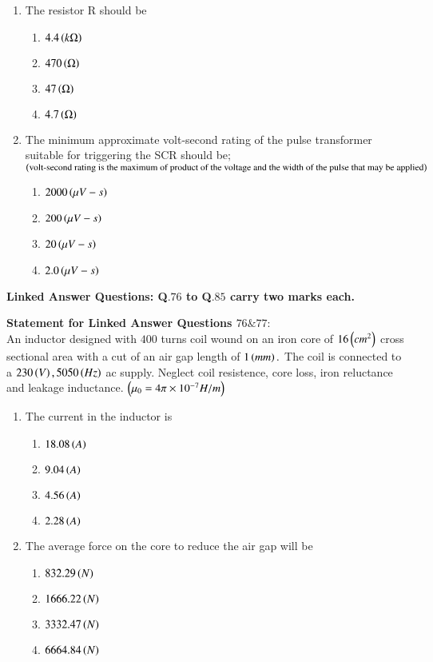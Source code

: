 \documentclass[journal,15pt,onecolumn]{IEEEtran}
\theoremstyle{remark}
\begin{document}
\begin{enumerate}[start=74]
    \item The resistor R should be
    \begin{enumerate}
        \item $4.4\left(k\ohm\right)$
        \item $470\left(\ohm\right)$
        \item $47\left(\ohm\right)$
        \item $4.7\left(\ohm\right)$
    \end{enumerate}
    \item The minimum approximate volt-second rating of the pulse transformer suitable for triggering the SCR should be$;$ $\left(\text{volt-second rating is the maximum of product of the voltage and the width of the pulse that may be applied}\right)$
    \begin{enumerate}
        \item $2000\left(\mu V-s\right)$
        \item $200\left(\mu V-s\right)$
        \item $20\left(\mu V-s\right)$
        \item $2.0\left(\mu V-s\right)$
    \end{enumerate}
\end{enumerate}
\begin{center}
    \textbf{Linked Answer Questions: Q$.76$ to Q$.85$ carry two marks each.}
\end{center}
\textbf{Statement for Linked Answer Questions $76 \& 77:$}\\
An inductor designed with $400$ turns coil wound on an iron core of $16\left(cm^2\right)$ cross sectional area with a cut of an air gap length of $1\left(mm\right).$ The coil is connected to a $230\left(V\right),5050\left(Hz\right)$ ac supply. Neglect coil resistence, core loss, iron reluctance and leakage inductance. $\left(\mu_0=4\pi\times10^{-7}H/m\right)$
\begin{enumerate}[start=76]
    \item The current in the inductor is
    \begin{enumerate}
        \item $18.08\left(A\right)$
        \item $9.04\left(A\right)$
        \item $4.56\left(A\right)$
        \item $2.28\left(A\right)$
    \end{enumerate}
    \item The average force on the core to reduce the air gap will be
    \begin{enumerate}
        \item $832.29\left(N\right)$
        \item $1666.22\left(N\right)$
        \item $3332.47\left(N\right)$
        \item $6664.84\left(N\right)$
    \end{enumerate}
\end{enumerate}
\end{document}
